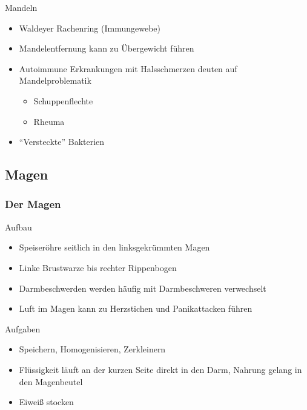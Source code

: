 \documentclass[xcolor=dvipsnames]{beamer}
\begin{document}
\begin{frame}[allowframebreaks]
        \begin{block}{Mandeln}
            \begin{itemize}
                \setlength\itemsep{1em}
                \item Waldeyer Rachenring (Immungewebe)
                \item Mandelentfernung kann zu Übergewicht führen
                \item Autoimmune Erkrankungen mit Halsschmerzen deuten auf Mandelproblematik
                \begin{itemize}
                    \item Schuppenflechte
                    \item Rheuma
                \end{itemize}
                \item "`Versteckte"' Bakterien
            \end{itemize}
        \end{block}

    \end{frame}

    \subsection{Magen}
    \begin{frame}[allowframebreaks]
        \frametitle{Der Magen}

        \begin{block}{Aufbau}
            \begin{itemize}
                \setlength\itemsep{1em}
                \item Speiseröhre seitlich in den linksgekrümmten Magen
                \item Linke Brustwarze bis rechter Rippenbogen
                \item Darmbeschwerden werden häufig mit Darmbeschweren verwechselt
                \item Luft im Magen kann zu Herzstichen und Panikattacken führen
            \end{itemize}
        \end{block}

        \framebreak

        \begin{block}{Aufgaben}
            \begin{itemize}
                \setlength\itemsep{1em}
                \item Speichern, Homogenisieren, Zerkleinern
                \item Flüssigkeit läuft an der kurzen Seite direkt in den Darm, Nahrung gelang in den Magenbeutel
                \item Eiweiß stocken
            \end{itemize}
        \end{block}
    \end{frame}
\end{document}

